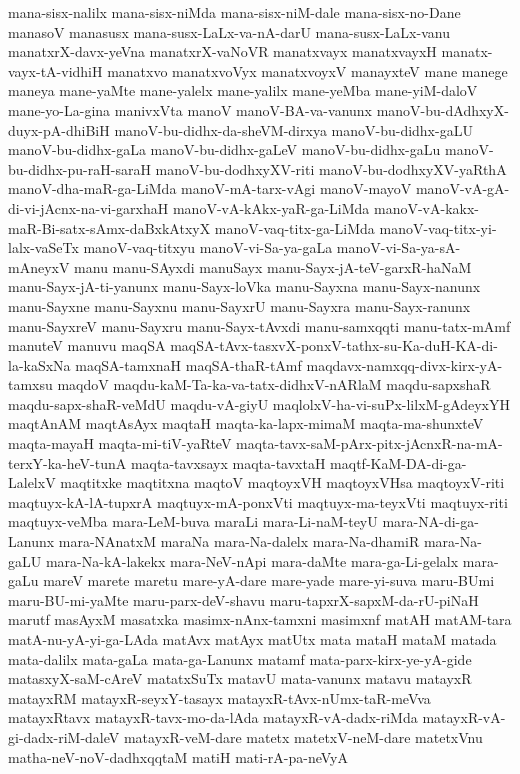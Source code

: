 {mana-sisx-nalilx
mana-sisx-niMda
mana-sisx-niM-dale
mana-sisx-no-Dane
manasoV
manasusx
mana-susx-LaLx-va-nA-darU
mana-susx-LaLx-vanu
manatxrX-davx-yeVna
manatxrX-vaNoVR
manatxvayx
manatxvayxH
manatx-vayx-tA-vidhiH
manatxvo
manatxvoVyx
manatxvoyxV
manayxteV
mane
manege
maneya
mane-yaMte
mane-yalelx
mane-yalilx
mane-yeMba
mane-yiM-daloV
mane-yo-La-gina
manivxVta
manoV
manoV-BA-va-vanunx
manoV-bu-dAdhxyX-duyx-pA-dhiBiH
manoV-bu-didhx-da-sheVM-dirxya
manoV-bu-didhx-gaLU
manoV-bu-didhx-gaLa
manoV-bu-didhx-gaLeV
manoV-bu-didhx-gaLu
manoV-bu-didhx-pu-raH-saraH
manoV-bu-dodhxyXV-riti
manoV-bu-dodhxyXV-yaRthA
manoV-dha-maR-ga-LiMda
manoV-mA-tarx-vAgi
manoV-mayoV
manoV-vA-gA-di-vi-jAcnx-na-vi-garxhaH
manoV-vA-kAkx-yaR-ga-LiMda
manoV-vA-kakx-maR-Bi-satx-sAmx-daBxkAtxyX
manoV-vaq-titx-ga-LiMda
manoV-vaq-titx-yi-lalx-vaSeTx
manoV-vaq-titxyu
manoV-vi-Sa-ya-gaLa
manoV-vi-Sa-ya-sA-mAneyxV
manu
manu-SAyxdi
manuSayx
manu-Sayx-jA-teV-garxR-haNaM
manu-Sayx-jA-ti-yanunx
manu-Sayx-loVka
manu-Sayxna
manu-Sayx-nanunx
manu-Sayxne
manu-Sayxnu
manu-SayxrU
manu-Sayxra
manu-Sayx-ranunx
manu-SayxreV
manu-Sayxru
manu-Sayx-tAvxdi
manu-samxqqti
manu-tatx-mAmf
manuteV
manuvu
maqSA
maqSA-tAvx-tasxvX-ponxV-tathx-su-Ka-duH-KA-di-la-kaSxNa
maqSA-tamxnaH
maqSA-thaR-tAmf
maqdavx-namxqq-divx-kirx-yA-tamxsu
maqdoV
maqdu-kaM-Ta-ka-va-tatx-didhxV-nARlaM
maqdu-sapxshaR
maqdu-sapx-shaR-veMdU
maqdu-vA-giyU
maqlolxV-ha-vi-suPx-lilxM-gAdeyxYH
maqtAnAM
maqtAsAyx
maqtaH
maqta-ka-lapx-mimaM
maqta-ma-shunxteV
maqta-mayaH
maqta-mi-tiV-yaRteV
maqta-tavx-saM-pArx-pitx-jAcnxR-na-mA-terxY-ka-heV-tunA
maqta-tavxsayx
maqta-tavxtaH
maqtf-KaM-DA-di-ga-LalelxV
maqtitxke
maqtitxna
maqtoV
maqtoyxVH
maqtoyxVHsa
maqtoyxV-riti
maqtuyx-kA-lA-tupxrA
maqtuyx-mA-ponxVti
maqtuyx-ma-teyxVti
maqtuyx-riti
maqtuyx-veMba
mara-LeM-buva
maraLi
mara-Li-naM-teyU
mara-NA-di-ga-Lanunx
mara-NAnatxM
maraNa
mara-Na-dalelx
mara-Na-dhamiR
mara-Na-gaLU
mara-Na-kA-lakekx
mara-NeV-nApi
mara-daMte
mara-ga-Li-gelalx
mara-gaLu
mareV
marete
maretu
mare-yA-dare
mare-yade
mare-yi-suva
maru-BUmi
maru-BU-mi-yaMte
maru-parx-deV-shavu
maru-tapxrX-sapxM-da-rU-piNaH
marutf
masAyxM
masatxka
masimx-nAnx-tamxni
masimxnf
matAH
matAM-tara
matA-nu-yA-yi-ga-LAda
matAvx
matAyx
matUtx
mata
mataH
mataM
matada
mata-dalilx
mata-gaLa
mata-ga-Lanunx
matamf
mata-parx-kirx-ye-yA-gide
matasxyX-saM-cAreV
matatxSuTx
matavU
mata-vanunx
matavu
matayxR
matayxRM
matayxR-seyxY-tasayx
matayxR-tAvx-nUmx-taR-meVva
matayxRtavx
matayxR-tavx-mo-da-lAda
matayxR-vA-dadx-riMda
matayxR-vA-gi-dadx-riM-daleV
matayxR-veM-dare
matetx
matetxV-neM-dare
matetxVnu
matha-neV-noV-dadhxqqtaM
matiH
mati-rA-pa-neVyA
}
